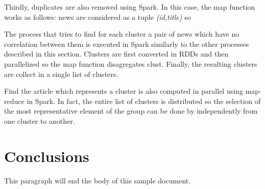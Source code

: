 \documentclass{acm_proc_article-sp}
\begin{document}
Thirdly, duplicates are also removed using Spark. In this case, the map function works as follows: news are considered as a tuple \textit{(id,title)} so

The process that tries to find for each cluster a pair of news which have no correlation between them is executed in Spark similarly to the other processes described in this section. Clusters are first converted in RDDs and then parallelized so the map function disagregates clust. Finally, the resulting clusters are collect in a single list of clusters.

Find the article which represents a cluster is also computed in parallel using map-reduce in Spark. In fact, the entire list of clusters is distributed so the selection of the most representative element of the group can be done by independently from one cluster to another.

\section{Conclusions}
This paragraph will end the body of this sample document.




\balancecolumns
\end{document}
